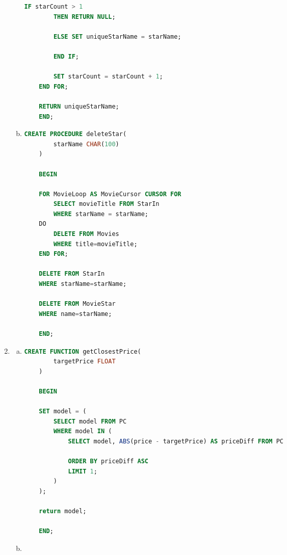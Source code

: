\documentclass[12pt]{article}
\begin{document}
\begin{enumerate}[1.]
\begin{enumerate}[a)]
\begin{lstlisting}[language=SQL]
        IF starCount > 1
        THEN RETURN NULL;

        ELSE SET uniqueStarName = starName;

        END IF;

        SET starCount = starCount + 1;
    END FOR;

    RETURN uniqueStarName;
    END;

    \end{lstlisting}

        \item

    \begin{lstlisting}[language=SQL]
    CREATE PROCEDURE deleteStar(
        starName CHAR(100)
    )

    BEGIN

    FOR MovieLoop AS MovieCursor CURSOR FOR
        SELECT movieTitle FROM StarIn
        WHERE starName = starName;
    DO
        DELETE FROM Movies
        WHERE title=movieTitle;
    END FOR;

    DELETE FROM StarIn
    WHERE starName=starName;

    DELETE FROM MovieStar
    WHERE name=starName;

    END;

    \end{lstlisting}

    \end{enumerate}

    \item

    \begin{enumerate}[a)]
        \item

    \begin{lstlisting}[language=SQL]
    CREATE FUNCTION getClosestPrice(
        targetPrice FLOAT
    )

    BEGIN

    SET model = (
        SELECT model FROM PC
        WHERE model IN (
            SELECT model, ABS(price - targetPrice) AS priceDiff FROM PC

            ORDER BY priceDiff ASC
            LIMIT 1;
        )
    );

    return model;

    END;

    \end{lstlisting}

        \item


\end{enumerate}
\end{enumerate}
\end{document}

